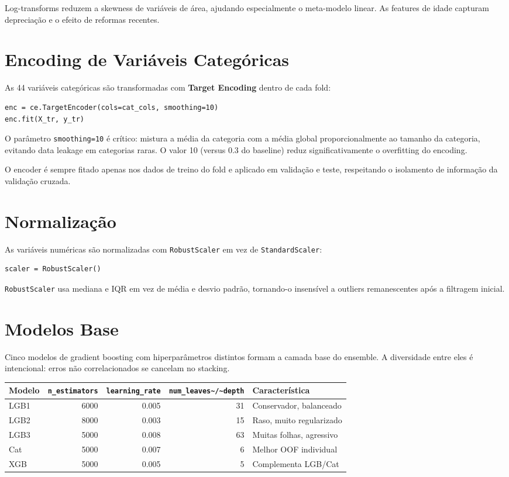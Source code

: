\documentclass[11pt]{article}
\begin{document}
Log-transforms reduzem a skewness de variáveis de área, ajudando
especialmente o meta-modelo linear. As features de idade capturam
depreciação e o efeito de reformas recentes.
\section{Encoding de Variáveis Categóricas}
\label{sec:org9561159}

As 44 variáveis categóricas são transformadas com \textbf{Target Encoding}
dentro de cada fold:

\begin{verbatim}
enc = ce.TargetEncoder(cols=cat_cols, smoothing=10)
enc.fit(X_tr, y_tr)
\end{verbatim}

O parâmetro \texttt{smoothing=10} é crítico: mistura a média da categoria com
a média global proporcionalmente ao tamanho da categoria, evitando
data leakage em categorias raras. O valor 10 (versus 0.3 do baseline)
reduz significativamente o overfitting do encoding.

O encoder é sempre fitado apenas nos dados de treino do fold e
aplicado em validação e teste, respeitando o isolamento de
informação da validação cruzada.
\section{Normalização}
\label{sec:org5974f3e}

As variáveis numéricas são normalizadas com \texttt{RobustScaler} em vez de
\texttt{StandardScaler}:

\begin{verbatim}
scaler = RobustScaler()
\end{verbatim}

\texttt{RobustScaler} usa mediana e IQR em vez de média e desvio padrão,
tornando-o insensível a outliers remanescentes após a filtragem
inicial.
\section{Modelos Base}
\label{sec:orgdfff7f0}

Cinco modelos de gradient boosting com hiperparâmetros distintos
formam a camada base do ensemble. A diversidade entre eles é
intencional: erros não correlacionados se cancelam no stacking.

\begin{center}
\begin{tabular}{lrrrl}
Modelo & \texttt{n\_estimators} & \texttt{learning\_rate} & \texttt{num\_leaves\textasciitilde{}/\textasciitilde{}depth} & Característica\\
\hline
LGB1 & 6000 & 0.005 & 31 & Conservador, balanceado\\
LGB2 & 8000 & 0.003 & 15 & Raso, muito regularizado\\
LGB3 & 5000 & 0.008 & 63 & Muitas folhas, agressivo\\
Cat & 5000 & 0.007 & 6 & Melhor OOF individual\\
XGB & 5000 & 0.005 & 5 & Complementa LGB/Cat\\
\end{tabular}
\end{center}
\end{document}
